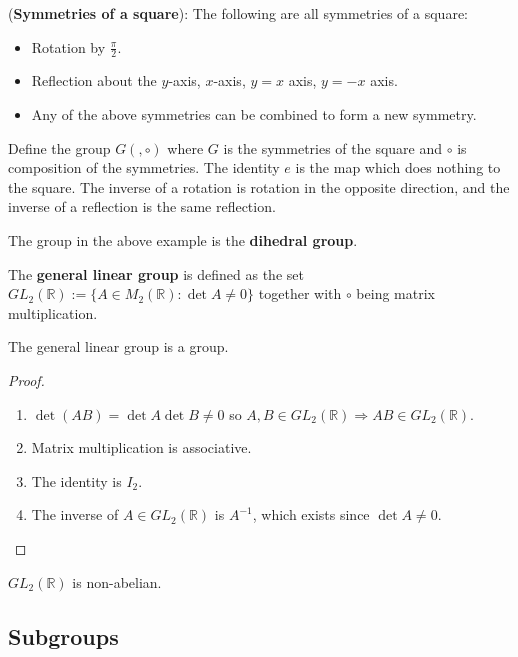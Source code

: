 \begin{example}
	(\textbf{Symmetries of a square}): The following are all symmetries of a square:
	\begin{itemize}
		\item Rotation by $\frac{\pi}{2}$.
		\item Reflection about the $y$-axis, $x$-axis, $y = x$ axis, $y = -x$ axis.
		\item Any of the above symmetries can be combined to form a new symmetry.
	\end{itemize}
	Define the group $G(, \circ)$ where $G$ is the symmetries of the square and $\circ$ is composition of the symmetries. The identity $e$ is the map which does nothing to the square. The inverse of a rotation is rotation in the opposite direction, and the inverse of a reflection is the same reflection.
\end{example}

\begin{definition}
	The group in the above example is the \textbf{dihedral group}.
\end{definition}

\begin{definition}
	The \textbf{general linear group} is defined as the set $GL_2 (\mathbb{R}) := \{ A \in M_2 (\mathbb{R}) : \det A \ne 0 \}$ together with $\circ$ being matrix multiplication.
\end{definition}

\begin{lemma}
	The general linear group is a group.
\end{lemma}

\begin{proof}
	\hfill
	\begin{enumerate}
		\item $\det (A B) = \det A \det B \ne 0$ so $A, B \in GL_2(\mathbb{R}) \Rightarrow AB \in GL_2(\mathbb{R})$.
		\item Matrix multiplication is associative.
		\item The identity is $I_2$.
		\item The inverse of $A \in GL_2(\mathbb{R})$ is $A^{-1}$, which exists since $\det A \ne 0$.
	\end{enumerate}
\end{proof}

\begin{remark}
	$GL_2(\mathbb{R})$ is non-abelian.
\end{remark}

\subsection{Subgroups}


